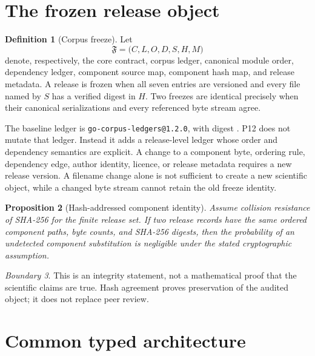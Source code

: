 \documentclass[11pt,a4paper]{article}
\theoremstyle{definition}
\newtheorem{definition}{Definition}[section]
\theoremstyle{plain}
\newtheorem{proposition}[definition]{Proposition}
\theoremstyle{remark}
\newtheorem{boundary}[definition]{Boundary}
\newcommand{\Fcal}{\mathfrak F}
\begin{document}
\tableofcontents
\clearpage

\section{The frozen release object}

\begin{definition}[Corpus freeze]
Let
\begin{equation}
\Fcal
=
\bigl(C,L,O,D,S,H,M\bigr)
\end{equation}
denote, respectively, the core contract, corpus ledger, canonical
module order, dependency ledger, component source map, component hash
map, and release metadata.  A release is frozen when all seven entries
are versioned and every file named by \(S\) has a verified digest in
\(H\).  Two freezes are identical precisely when their canonical
serializations and every referenced byte stream agree.
\end{definition}

The baseline ledger is
\texttt{go-corpus-ledgers@1.2.0}, with digest
\BaselineLedgerHash.  P12 does not mutate that ledger.
Instead it adds a release-level ledger whose order and dependency
semantics are explicit.  A change to a component byte, ordering rule,
dependency edge, author identity, licence, or release metadata requires
a new release version.  A filename change alone is not sufficient to
create a new scientific object, while a changed byte stream cannot
retain the old freeze identity.

\begin{proposition}[Hash-addressed component identity]
Assume collision resistance of SHA-256 for the finite release set.
If two release records have the same ordered component paths, byte
counts, and SHA-256 digests, then the probability of an undetected
component substitution is negligible under the stated cryptographic
assumption.
\end{proposition}

\begin{boundary}
This is an integrity statement, not a mathematical proof that the
scientific claims are true.  Hash agreement proves preservation of the
audited object; it does not replace peer review.
\end{boundary}

\section{Common typed architecture}
\end{document}
